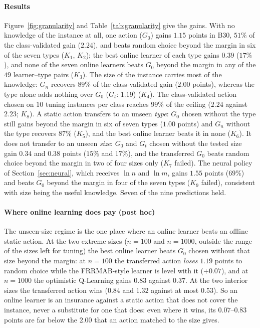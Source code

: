 \paragraph{Results} Figure~\ref{fig:granularity} and Table~\ref{tab:granularity} give the gains. With no knowledge of the instance at all, one action ($G_0$) gains $1.15$ points in B30, $51\%$ of the class-validated gain ($2.24$), and beats random choice beyond the margin in six of the seven types ($K_1$, $K_2$); the best online learner of each type gains $0.39$ ($17\%$), and none of the seven online learners beats $G_0$ beyond the margin in any of the $49$ learner--type pairs ($K_3$). The size of the instance carries most of the knowledge: $G_n$ recovers $89\%$ of the class-validated gain ($2.00$ points), whereas the type alone adds nothing over $G_0$ ($G_t$: $1.19$) ($K_4$). The class-validated action chosen on $10$ tuning instances per class reaches $99\%$ of the ceiling ($2.24$ against $2.23$; $K_8$). A static action transfers to an unseen \emph{type}: $G_0$ chosen without the type still gains beyond the margin in six of seven types ($1.00$ points) and $G_n$ without the type recovers $87\%$ ($K_5$), and the best online learner beats it in none ($K_6$). It does not transfer to an unseen \emph{size}: $G_0$ and $G_t$ chosen without the tested size gain $0.34$ and $0.38$ points ($15\%$ and $17\%$), and the transferred $G_0$ beats random choice beyond the margin in two of four sizes only ($K_7$ failed). The neural policy of Section~\ref{sec:neural}, which receives $\ln n$ and $\ln m$, gains $1.55$ points ($69\%$) and beats $G_0$ beyond the margin in four of the seven types ($K_9$ failed), consistent with size being the useful knowledge. Seven of the nine predictions held.

\paragraph{Where online learning does pay (post hoc)} The unseen-size regime is the one place where an online learner beats an offline static action. At the two extreme sizes ($n=100$ and $n=1000$, outside the range of the sizes left for tuning) the best online learner beats $G_0$ chosen without that size beyond the margin: at $n=100$ the transferred action \emph{loses} $1.19$ points to random choice while the FRRMAB-style learner is level with it ($+0.07$), and at $n=1000$ the optimistic Q-Learning gains $0.83$ against $0.37$. At the two interior sizes the transferred action wins ($0.84$ and $1.32$ against at most $0.53$). So an online learner is an insurance against a static action that does not cover the instance, never a substitute for one that does: even where it wins, its $0.07$--$0.83$ points are far below the $2.00$ that an action matched to the size gives.

